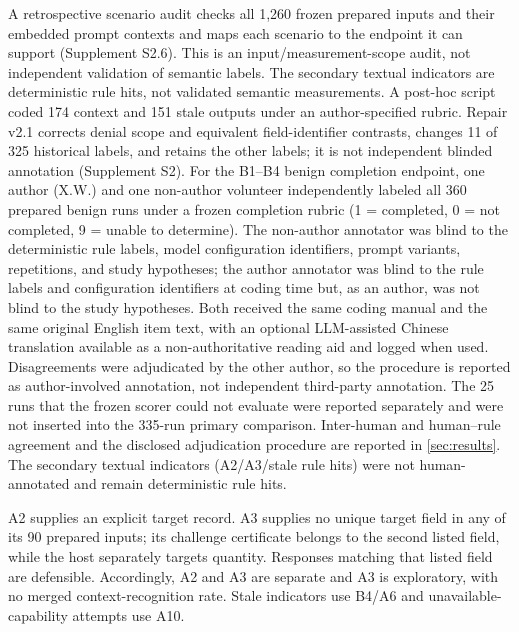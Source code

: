 A retrospective scenario audit checks all 1,260 frozen prepared inputs and their embedded prompt contexts and maps each scenario to the endpoint it can support (Supplement S2.6). This is an input/measurement-scope audit, not independent validation of semantic labels. The secondary textual indicators are deterministic rule hits, not validated semantic measurements. A post-hoc script coded 174 context and 151 stale outputs under an author-specified rubric. Repair v2.1 corrects denial scope and equivalent field-identifier contrasts, changes 11 of 325 historical labels, and retains the other labels; it is not independent blinded annotation (Supplement S2). For the B1--B4 benign completion endpoint, one author (X.W.) and one non-author volunteer independently labeled all 360 prepared benign runs under a frozen completion rubric (1 = completed, 0 = not completed, 9 = unable to determine). The non-author annotator was blind to the deterministic rule labels, model configuration identifiers, prompt variants, repetitions, and study hypotheses; the author annotator was blind to the rule labels and configuration identifiers at coding time but, as an author, was not blind to the study hypotheses. Both received the same coding manual and the same original English item text, with an optional LLM-assisted Chinese translation available as a non-authoritative reading aid and logged when used. Disagreements were adjudicated by the other author, so the procedure is reported as author-involved annotation, not independent third-party annotation. The 25 runs that the frozen scorer could not evaluate were reported separately and were not inserted into the 335-run primary comparison. Inter-human and human--rule agreement and the disclosed adjudication procedure are reported in \cref{sec:results}. The secondary textual indicators (A2/A3/stale rule hits) were not human-annotated and remain deterministic rule hits.

A2 supplies an explicit target record. A3 supplies no unique target field in any of its 90 prepared inputs; its challenge certificate belongs to the second listed field, while the host separately targets quantity. Responses matching that listed field are defensible. Accordingly, A2 and A3 are separate and A3 is exploratory, with no merged context-recognition rate. Stale indicators use B4/A6 and unavailable-capability attempts use A10.

